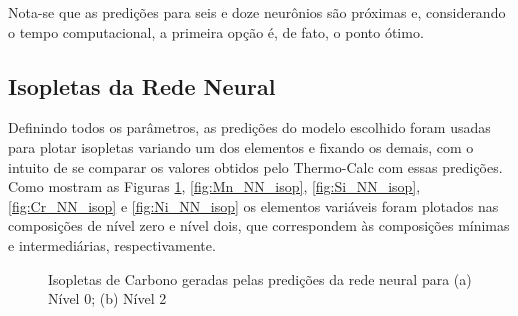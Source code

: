 \documentclass[brazil,tf,epusp]{usp}  %
\begin{document}
Nota-se que as predições para seis e doze neurônios são próximas e, considerando o tempo computacional, a primeira opção é, de fato, o ponto ótimo.

\subsection{Isopletas da Rede Neural}

Definindo todos os parâmetros, as predições do modelo escolhido foram usadas para plotar isopletas variando um dos elementos e fixando os demais, com o intuito de se comparar os valores obtidos pelo Thermo-Calc\textregistered{} com essas predições. Como mostram as Figuras \ref{fig:C_NN_isop}, \ref{fig:Mn_NN_isop}, \ref{fig:Si_NN_isop}, \ref{fig:Cr_NN_isop} e \ref{fig:Ni_NN_isop} os elementos variáveis foram plotados nas composições de nível zero e nível dois, que correspondem às composições mínimas e intermediárias, respectivamente.

\begin{figure}
\caption{Isopletas de Carbono geradas pelas predições da rede neural para (a) Nível 0; (b) Nível 2 }
\label{fig:C_NN_isop}
\end{figure}
\end{document}
